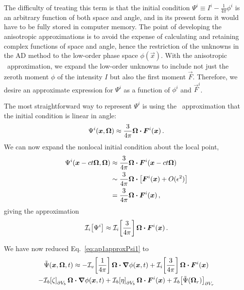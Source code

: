 The difficulty of treating this term is that the initial condition $\Psi^i
\equiv I^i - \frac{1}{4\pi}\phi^i$ is an arbitrary function of both space and
angle, and in its present form it would have to be fully stored in computer
memory.  The point of developing the anisotropic approximations is to avoid the
expense of calculating and retaining complex functions of space and angle, hence
the restriction of the unknowns in the AD method to the low-order phase space
$\phi(\vec{x})$. With the anisotropic \Pone\ approximation, we expand the
low-order unknowns to include not just the zeroth moment $\phi$ of the intensity
$I$ but also the first moment $\vec{F}$.  Therefore, we desire an approximate
expression for $\Psi^i$ as a function of $\phi^i$ and $\vec{F}^i$.

The most straightforward way to represent $\Psi^i$ is using the \Pone\
approximation that the initial condition is linear in angle:
\begin{equation*}
  \Psi^i(\bm{x},\bm{\Omega})
  \approx \frac{3}{4\pi} \bm{\Omega} \bm{\cdot} \bm{F}^i(\bm{x}) \,.
\end{equation*}
We can now expand the nonlocal initial condition about the local point,
\begin{align*}
  \Psi^i( \bm{x} - ct \bm{\Omega}, \bm{\Omega})
  & \approx  \frac{3}{4\pi} \bm{\Omega} \bm{\cdot} \bm{F}^i( \bm{x} - ct \bm{\Omega})
  \\
  &\sim \frac{3}{4\pi} \bm{\Omega} \bm{\cdot} \left[ 
  \bm{F}^i( \bm{x} ) + O(\epsilon^2) \right]
  \\
  &= \frac{3}{4\pi} \bm{\Omega} \bm{\cdot} \bm{F}^i( \bm{x} ) \,,
\end{align*}
giving the approximation
\begin{equation*}
  \mathcal{I}_{i}\!\left[\Psi^i\right] \approx \mathcal{I}_{i}\!\left[\frac{3}{4\pi}\right] \bm{\Omega} \bm{\cdot}
  \bm{F}^i( \bm{x} ) \,.
\end{equation*}

We have now reduced Eq.~\eqref{eq:ap1approxPsi1} to
\begin{multline} \label{eq:ap1approxPsi2}
  \tilde\Psi(\bm{x},\bm{\Omega},t)
  \approx 
  - \mathcal{I}_{v}\!\left[\frac{1}{4\pi}\right] \bm{\Omega}\bm{\cdot} \bm{\nabla} \phi(\bm{x},t)
  + \mathcal{I}_{i}\!\left[\frac{3}{4\pi}\right] \bm{\Omega} \bm{\cdot} \bm{F}^i( \bm{x} )
  \\
  - \mathcal{I}_{b}\!\left[\zeta\right]_{\partial V_b} \bm{\Omega}\bm{\cdot} \bm{\nabla} \phi(\bm{x},t)
  + \mathcal{I}_{b}\!\left[\eta\right]_{\partial V_b} \bm{\Omega}\bm{\cdot} \bm{F}^i(\bm{x})
  + \mathcal{I}_{b}\!\left[\tilde\Psi(\bm{\Omega}_r)\right]_{\partial V_r}
\end{multline}

